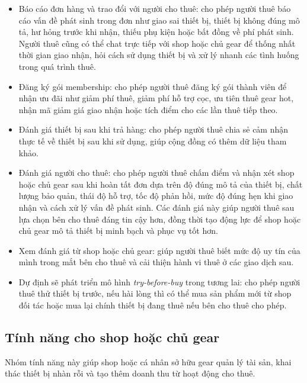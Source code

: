 \begin{itemize}
    \item Báo cáo đơn hàng và trao đổi với người cho thuê: cho phép người thuê báo cáo vấn đề phát sinh trong đơn như giao sai thiết bị, thiết bị không đúng mô tả, hư hỏng trước khi nhận, thiếu phụ kiện hoặc bất đồng về phí phát sinh. Người thuê cũng có thể chat trực tiếp với shop hoặc chủ gear để thống nhất thời gian giao nhận, hỏi cách sử dụng thiết bị và xử lý nhanh các tình huống trong quá trình thuê.
    \item Đăng ký gói membership: cho phép người thuê đăng ký gói thành viên để nhận ưu đãi như giảm phí thuê, giảm phí hỗ trợ cọc, ưu tiên thuê gear hot, nhận mã giảm giá giao nhận hoặc tích điểm cho các lần thuê tiếp theo.
    \item Đánh giá thiết bị sau khi trả hàng: cho phép người thuê chia sẻ cảm nhận thực tế về thiết bị sau khi sử dụng, giúp cộng đồng có thêm dữ liệu tham khảo.
    \item Đánh giá người cho thuê: cho phép người thuê chấm điểm và nhận xét shop hoặc chủ gear sau khi hoàn tất đơn dựa trên độ đúng mô tả của thiết bị, chất lượng bảo quản, thái độ hỗ trợ, tốc độ phản hồi, mức độ đúng hẹn khi giao nhận và cách xử lý vấn đề phát sinh. Các đánh giá này giúp người thuê sau lựa chọn bên cho thuê đáng tin cậy hơn, đồng thời tạo động lực để shop hoặc chủ gear mô tả thiết bị minh bạch và phục vụ tốt hơn.
    \item Xem đánh giá từ shop hoặc chủ gear: giúp người thuê biết mức độ uy tín của mình trong mắt bên cho thuê và cải thiện hành vi thuê ở các giao dịch sau.
    \item Dự định sẽ phát triển mô hình \textit{try-before-buy} trong tương lai: cho phép người thuê thử thiết bị trước, nếu hài lòng thì có thể mua sản phẩm mới từ shop đối tác hoặc mua lại chính thiết bị đang thuê nếu bên cho thuê cho phép.
\end{itemize}

\subsection{Tính năng cho shop hoặc chủ gear}

Nhóm tính năng này giúp shop hoặc cá nhân sở hữu gear quản lý tài sản, khai thác thiết bị nhàn rỗi và tạo thêm doanh thu từ hoạt động cho thuê.

